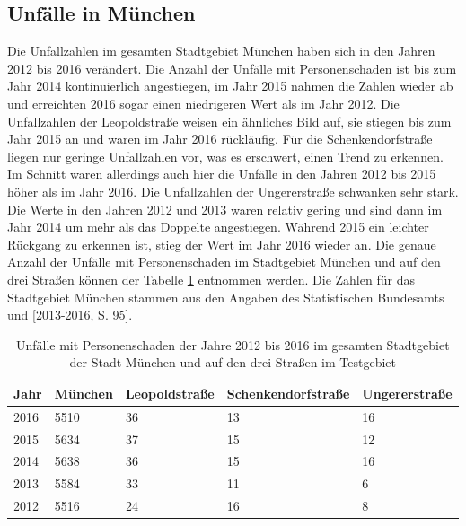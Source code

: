 \subsection{Unfälle in München}
Die Unfallzahlen im gesamten Stadtgebiet München haben sich in den Jahren 2012 bis 2016 verändert. Die Anzahl der Unfälle mit Personenschaden ist bis zum Jahr 2014 kontinuierlich angestiegen, im Jahr 2015 nahmen die Zahlen wieder ab und erreichten 2016 sogar einen niedrigeren Wert als im Jahr 2012. Die Unfallzahlen der Leopoldstraße weisen ein ähnliches Bild auf, sie stiegen bis zum Jahr 2015 an und waren im Jahr 2016 rückläufig. Für die Schenkendorfstraße liegen nur geringe Unfallzahlen vor, was es erschwert, einen Trend zu erkennen. Im Schnitt waren allerdings auch hier die Unfälle in den Jahren 2012 bis 2015 höher als im Jahr 2016. Die Unfallzahlen der Ungererstraße schwanken sehr stark. Die Werte in den Jahren 2012 und 2013 waren relativ gering und sind dann im Jahr 2014 um mehr als das Doppelte angestiegen. Während 2015 ein leichter Rückgang zu erkennen ist, stieg der Wert im Jahr 2016 wieder an. Die genaue Anzahl der Unfälle mit Personenschaden im Stadtgebiet München und auf den drei Straßen können der Tabelle \ref{tab:Unfälle München Personenschaden} entnommen werden. Die Zahlen für das Stadtgebiet München stammen aus den Angaben des Statistischen Bundesamts \parencite[S. 98]{StatistischesBundesamt.2017} und [2013-2016, S. 95].
\begin{table}[htpb]
	\scriptsize
	\caption[Unfälle mit Personenschaden]{Unfälle mit Personenschaden der Jahre 2012 bis 2016 im gesamten Stadtgebiet der Stadt München und auf den drei Straßen im Testgebiet}\label{tab:Unfälle München Personenschaden}
	\centering
	\begin{tabular}{l l l  l p{2cm}}
		\toprule
		Jahr & München & Leopoldstraße & Schenkendorfstraße & Ungererstraße \\
		\midrule
		2016 & 5510 & 36 & 13 & 16\\
		2015 & 5634 & 37 & 15 & 12\\
		2014 & 5638 & 36 & 15 & 16\\
		2013 & 5584 & 33 & 11 & 6\\
		2012 & 5516 & 24 & 16 & 8\\
		\bottomrule
	\end{tabular}
\end{table}

